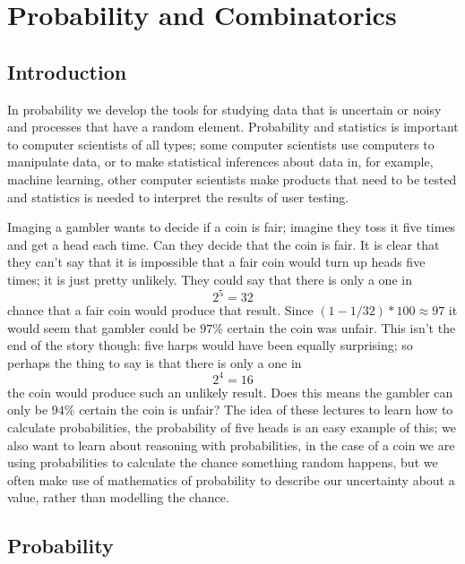 \documentclass[11pt,a4paper]{scrartcl}
\begin{document}
\section*{Probability and Combinatorics}

\subsection*{Introduction}

In probability we develop the tools for studying data that is
uncertain or noisy and processes that have a random
element. Probability and statistics is important to computer
scientists of all types; some computer scientists use computers to
manipulate data, or to make statistical inferences about data in, for
example, machine learning, other computer scientists make products
that need to be tested and statistics is needed to interpret the
results of user testing.

Imaging a gambler wants to decide if a coin is fair; imagine they toss
it five times and get a head each time. Can they decide that the coin is
fair. It is clear that they can't say that it is
impossible that a fair coin would turn up heads five times; it is just
pretty unlikely. They could say that there is only a one in
\begin{equation}
2^{5}=32
\end{equation}
chance that a fair coin would produce that result. Since
$(1-1/32)*100\approx 97$ it would seem that gambler could be $97\%$
certain the coin was unfair. This isn't the end of the story though:
five harps would have been equally surprising; so perhaps the thing to
say is that there is only a one in
\begin{equation}
2^{4}=16
\end{equation}
the coin would produce such an unlikely result. Does this means the
gambler can only be $94\%$ certain the coin is unfair? The idea of
these lectures to learn how to calculate probabilities, the
probability of five heads is an easy example of this; we also want to
learn about reasoning with probabilities, in the case of a coin we are
using probabilities to calculate the chance something random happens,
but we often make use of mathematics of probability to describe our
uncertainty about a value, rather than modelling the chance.

\subsection*{Probability}
\end{document}
